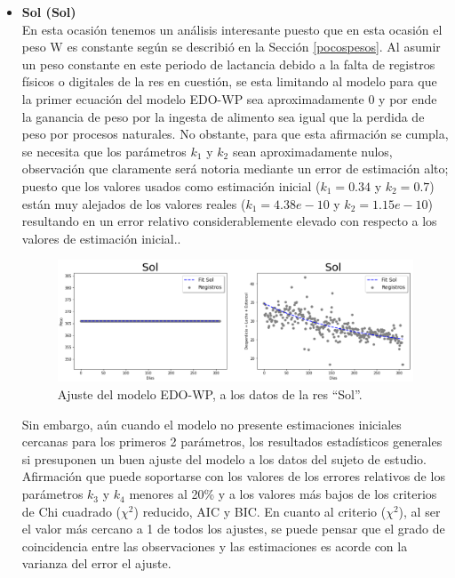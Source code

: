 \begin{itemize}
    \item \textbf{Sol (Sol)}\\
    
    En esta ocasión tenemos un análisis interesante puesto que en esta ocasión el peso W es constante según se describió en la Sección \ref{pocospesos}. Al asumir un peso constante en este periodo de lactancia debido a la falta de registros físicos o digitales de la res en cuestión, se esta limitando al modelo para que la primer ecuación del modelo EDO-WP sea aproximadamente 0 y por ende la ganancia de peso por la ingesta de alimento sea igual que la perdida de peso por procesos naturales. No obstante, para que esta afirmación se cumpla, se necesita que los parámetros $k_{1}$ y $k_{2}$ sean aproximadamente nulos, observación que claramente será notoria mediante un error de estimación alto; puesto que los valores usados como estimación inicial ($k_{1}=0.34$ y $k_{2}=0.7$) están muy alejados de los valores reales ($k_{1}=4.38e-10$ y $k_{2}=1.15e-10$) resultando en un error relativo considerablemente elevado con respecto a los valores de estimación inicial.. 
    
        \begin{figure}[H]
            \centering
            \includegraphics[scale=0.47]{img/ajustemodSol.png}
            \caption{Ajuste del modelo EDO-WP, a los datos de la res ``Sol''.}
            \label{ajustemodSolpng}
        \end{figure}

    Sin embargo, aún cuando el modelo no presente estimaciones iniciales cercanas para los primeros 2 parámetros, los resultados estadísticos generales si presuponen un buen ajuste del modelo a los datos del sujeto de estudio. Afirmación que puede soportarse con los valores de los errores relativos de los parámetros $k_{3}$ y $k_{4}$ menores al 20\% y a los valores más bajos de los criterios de Chi cuadrado ($\chi^{2}$) reducido, AIC y BIC. En cuanto al criterio ($\chi^{2}$), al ser el valor más cercano a 1 de todos los ajustes, se puede pensar que el grado de coincidencia entre las observaciones y las estimaciones es acorde con la varianza del error el ajuste.         


\end{itemize}
